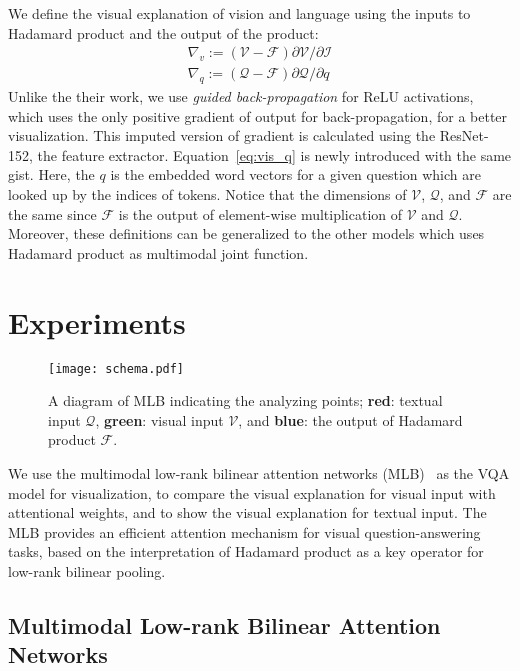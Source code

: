 \documentclass{article}
\begin{document}
We define the visual explanation of vision and language using the inputs to Hadamard product and the output of the product:
\begin{align}
  \nabla_v := (\mathcal{V}-\mathcal{F}) \partial{\mathcal{V}} / \partial{\mathcal{I}} \label{eq:vis_v} \\
  \nabla_q := (\mathcal{Q}-\mathcal{F}) \partial{\mathcal{Q}} / \partial{q} \label{eq:vis_q}
\end{align}
Unlike the their work, we use \textit{guided back-propagation} for ReLU activations, which uses the only positive gradient of output for back-propagation, for a better visualization. This imputed version of gradient is calculated using the ResNet-152, the feature extractor. Equation~\ref{eq:vis_q} is newly introduced with the same gist. Here, the $q$ is the embedded word vectors for a given question which are looked up by the indices of tokens. Notice that the dimensions of $\mathcal{V}$, $\mathcal{Q}$, and $\mathcal{F}$ are the same since $\mathcal{F}$ is the output of element-wise multiplication of $\mathcal{V}$ and $\mathcal{Q}$. Moreover, these definitions can be generalized to the other models which uses Hadamard product as multimodal joint function. 

\section{Experiments}

\setlength{\columnsep}{1.5em}
\begin{wrapfigure}{r}{0.33\textwidth}
  \centering
  \texttt{[image: schema.pdf]}
  \caption{A diagram of MLB indicating the analyzing points; \textbf{red}: textual input $\mathcal{Q}$, \textbf{green}: visual input $\mathcal{V}$, and \textbf{blue}: the output of Hadamard product $\mathcal{F}$. \label{fig:schema}}
  \vspace{-2em}
\end{wrapfigure}

We use the multimodal low-rank bilinear attention networks (MLB)~\cite{Kim2017} as the VQA model for visualization, to compare the visual explanation for visual input with attentional weights, and to show the visual explanation for textual input. The MLB provides an efficient attention mechanism for visual question-answering tasks, based on the interpretation of Hadamard product as a key operator for low-rank bilinear pooling.  

\subsection{Multimodal Low-rank Bilinear Attention Networks}
\label{sec:mlb}
\end{document}
